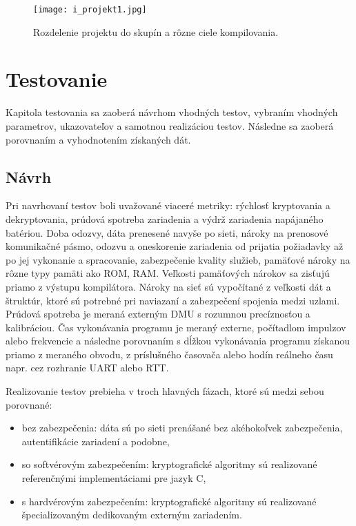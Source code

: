 \documentclass[12pt,a4paper,oneside,openright]{report}
\begin{document}
	\begin{figure*}[h]
		\centering
		\texttt{[image: i\_projekt1.jpg]}
		\caption{Rozdelenie projektu do skupín a rôzne ciele kompilovania.}
		\label{f:keil_project}
	\end{figure*}

\chapter{Testovanie} \label{s_testing}
Kapitola testovania sa zaoberá návrhom vhodných testov, vybraním vhodných parametrov, ukazovateľov a samotnou realizáciou testov. Následne sa zaoberá porovnaním a vyhodnotením získaných dát.

\section{Návrh}
Pri navrhovaní testov boli uvažované viaceré metriky: rýchlosť kryptovania a dekryptovania, prúdová spotreba zariadenia a výdrž zariadenia napájaného batériou. Doba odozvy, dáta prenesené navyše po sieti, nároky na prenosové komunikačné pásmo, odozvu a oneskorenie zariadenia od prijatia požiadavky až po jej vykonanie a spracovanie, zabezpečenie kvality služieb, pamäťové nároky na rôzne typy pamäti ako ROM, RAM.
Veľkosti pamäťových nárokov sa zisťujú priamo z výstupu kompilátora. Nároky na sieť sú vypočítané z veľkosti dát a štruktúr, ktoré sú potrebné pri naviazaní a zabezpečení spojenia medzi uzlami.
Prúdová spotreba je meraná externým DMU s rozumnou precíznosťou a kalibráciou.
Čas vykonávania programu je meraný externe, počítadlom impulzov alebo frekvencie a následne porovnaním s dĺžkou vykonávania programu získanou priamo z meraného obvodu, z príslušného časovača alebo hodín reálneho času napr. cez rozhranie UART alebo RTT.

Realizovanie testov prebieha v troch hlavných fázach, ktoré sú medzi sebou porovnané:
\singlespacing
\begin{itemize}
	\item bez zabezpečenia: dáta sú po sieti prenášané bez akéhokoľvek zabezpečenia, autentifikácie zariadení a podobne,
	\item so softvérovým zabezpečením: kryptografické algoritmy sú realizované referenčnými implementáciami pre jazyk C,
	\item s hardvérovým zabezpečením: kryptografické algoritmy sú realizované špecializovaným dedikovaným externým zariadením.
\end{itemize}
\onehalfspacing
\end{document}
